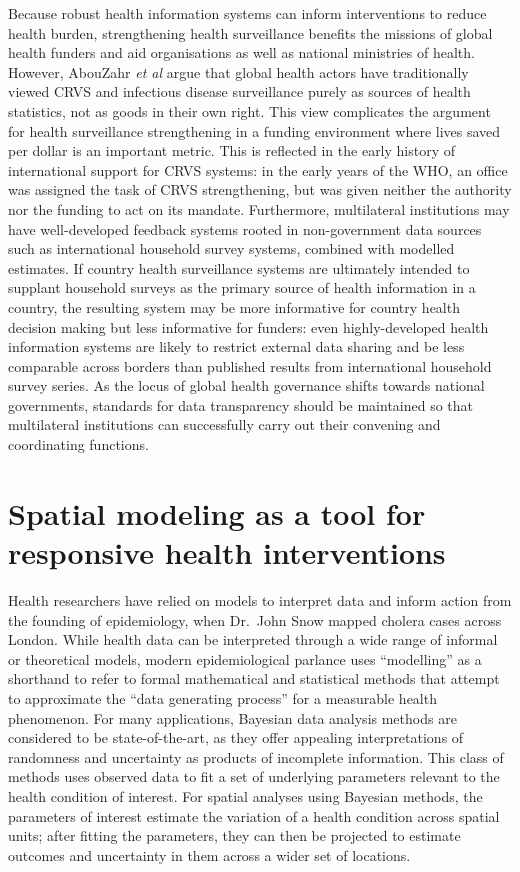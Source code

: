 \documentclass[
]{report}
\begin{document}
Because robust health information systems can inform interventions to reduce health burden, strengthening health surveillance benefits the missions of global health funders and aid organisations as well as national ministries of health. However, AbouZahr \emph{et al} argue that global health actors have traditionally viewed CRVS and infectious disease surveillance purely as sources of health statistics, not as goods in their own right.\autocite{AbouZahr2015} This view complicates the argument for health surveillance strengthening in a funding environment where lives saved per dollar is an important metric. This is reflected in the early history of international support for CRVS systems: in the early years of the WHO, an office was assigned the task of CRVS strengthening, but was given neither the authority nor the funding to act on its mandate.\autocite{AbouZahr2015} Furthermore, multilateral institutions may have well-developed feedback systems rooted in non-government data sources such as international household survey systems, combined with modelled estimates. If country health surveillance systems are ultimately intended to supplant household surveys as the primary source of health information in a country, the resulting system may be more informative for country health decision making but less informative for funders: even highly-developed health information systems are likely to restrict external data sharing and be less comparable across borders than published results from international household survey series. As the locus of global health governance shifts towards national governments, standards for data transparency should be maintained so that multilateral institutions can successfully carry out their convening and coordinating functions.

\hypertarget{spatial-modeling-as-a-tool-for-responsive-health-interventions}{%
\section{Spatial modeling as a tool for responsive health interventions}\label{spatial-modeling-as-a-tool-for-responsive-health-interventions}}

Health researchers have relied on models to interpret data and inform action from the founding of epidemiology, when Dr.~John Snow mapped cholera cases across London. While health data can be interpreted through a wide range of informal or theoretical models, modern epidemiological parlance uses ``modelling'' as a shorthand to refer to formal mathematical and statistical methods that attempt to approximate the ``data generating process'' for a measurable health phenomenon. For many applications, Bayesian data analysis methods are considered to be state-of-the-art, as they offer appealing interpretations of randomness and uncertainty as products of incomplete information.\autocite{McElreath2016} This class of methods uses observed data to fit a set of underlying parameters relevant to the health condition of interest. For spatial analyses using Bayesian methods, the parameters of interest estimate the variation of a health condition across spatial units; after fitting the parameters, they can then be projected to estimate outcomes and uncertainty in them across a wider set of locations.
\end{document}
